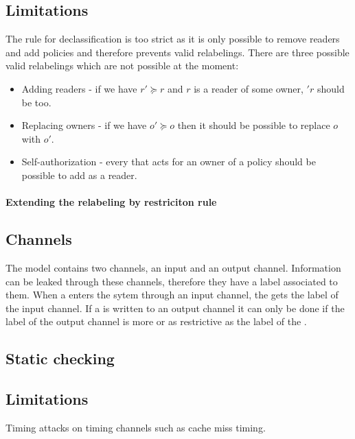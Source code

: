 \subsection{Limitations}
The rule for declassification is too strict as it is only possible to remove readers and add policies and therefore prevents valid relabelings.
There are three possible valid relabelings which are not possible at the moment:
\begin{itemize}
\item Adding readers - if we have $r' \succeq r$ and $r$ is a reader of some owner, $'r$ should be too.
\item Replacing owners - if we have $o' \succeq o$ then it should be possible to replace $o$ with $o'$.
\item Self-authorization - every \principal{} that acts for an owner of a policy should be possible to add as a reader.
\end{itemize}

\paragraph{Extending the relabeling by restriciton rule}

\subsection{Channels}
The model contains two channels, an input and an output channel.
Information can be leaked through these channels, therefore they have a label associated to them.
When a \xvalue{} enters the sytem through an input channel, the \xvalue{} gets the label of the input channel.
If a \xvalue{} is written to an output channel it can only be done if the label of the output channel is more or as restrictive as the label of the \xvalue{}.

\subsection{Static checking}

\subsection{Limitations}
Timing attacks on timing channels such as cache miss timing.
